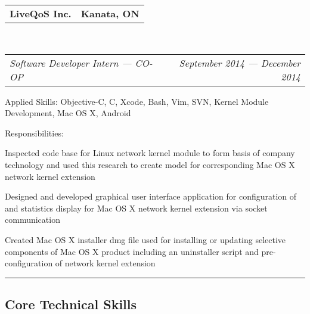 \documentclass[10pt,letterpaper]{article}
\makeatletter
\newenvironment{indentsection}[1]%
{\begin{list}{}%
  {\setlength{\leftmargin}{#1}}%
  \item[]%
}
{\end{list}}
\newcommand{\headerrow}[2]
{\begin{tabular*}{\linewidth}{l@{\extracolsep{\fill}}r}
  #1 &
  #2 \\
\end{tabular*}}
\makeatother
\begin{document}
\begin{itemize}
  \item
  \headerrow
    {\textbf{LiveQoS Inc.}}
    {\textbf{Kanata, ON}}
  \\
  \headerrow
    {\emph{Software Developer Intern — CO-OP}}
    {\emph{September 2014 — December 2014}}
  \begin{indentsection}{1em}
    \begin{description*}
      \item[Applied Skills:]
      Objective-C, C, Xcode, Bash, Vim, SVN, Kernel Module Development, Mac OS X,
      Android
      \item[Responsibilities:]
      \hfill
      \begin{itemize*}
        \item Inspected code base for Linux network kernel module to form basis of
        company technology and used this research to create model for
        corresponding Mac OS X network kernel extension
        \item Designed and developed graphical user interface application for
        configuration of and statistics display for Mac OS X network kernel
        extension via socket communication
        \item Created Mac OS X installer dmg file used for installing or updating
        selective components of Mac OS X product including an uninstaller script
        and pre-configuration of network kernel extension
      \end{itemize*}
    \end{description*}
  \end{indentsection}

\end{itemize}

\hrule
\vspace{-0.4em}
\subsection*{Core Technical Skills}
\end{document}
